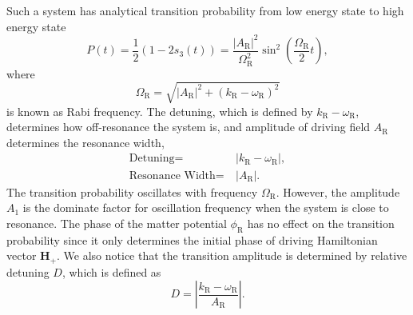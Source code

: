 \documentclass[%
reprint,
 amsmath,amssymb,
 prd,
]{revtex4-1}
\newcommand{\RD}{D}
\begin{document}
Such a system has analytical transition probability from low energy state to high energy state
\begin{equation}
    P(t) = \frac{1}{2}(1- 2 s_3(t))= \frac{\left \lvert A_{\mathrm{R}} \right \rvert ^2}{ \Omega_{\mathrm R}^2 } \sin^2 \left( \frac{\Omega_{\mathrm R}}{2} t \right),
    \label{rabi-system-transition-probability}
\end{equation}
where
\begin{equation}
\Omega_{\mathrm R} = \sqrt{ \lvert A_{\mathrm{R}}\rvert^2 + (k_{\mathrm{R}} - \omega_{\mathrm R})^2 }
\end{equation} is known as Rabi frequency. The detuning, which is defined by $k_{\mathrm{R}} - \omega_{\mathrm R}$, determines how off-resonance the system is, and amplitude of driving field $A_{\mathrm{R}}$ determines the resonance width,
\begin{align}
\text{Detuning} =&~\lvert k_{\mathrm{R}} - \omega_{\mathrm R} \rvert, \\
\text{Resonance Width} =&~\lvert A_{\mathrm R} \rvert.
\end{align}
The transition probability oscillates with frequency $\Omega_{\mathrm R}$. However, the amplitude $A_1$ is the dominate factor for oscillation frequency when the system is close to resonance. The phase of the matter potential $\phi_{\mathrm{R}}$ has no effect on the transition probability since it only determines the initial phase of driving Hamiltonian vector $\mathbf{H}_+$. We also notice that the transition amplitude is determined by relative detuning $\RD$, which is defined as
\begin{equation}
    \RD = \left\lvert \frac{ k_{\mathrm R} - \omega_{\mathrm R}}{A_{\mathrm R}} \right\rvert.
\end{equation}
\end{document}

